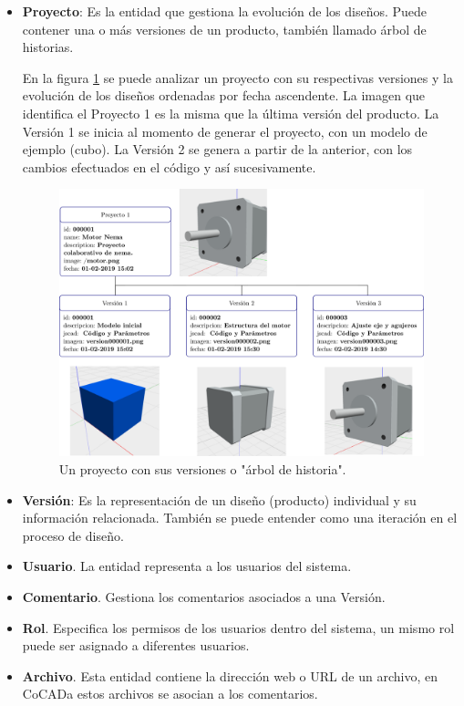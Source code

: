 \begin{itemize}
    \item \textbf{Proyecto}: Es la entidad que gestiona la  evolución de los diseños. Puede contener una o más versiones de un producto, también llamado árbol de historias. 
    
    En la figura \ref{fig:schema2} se puede analizar un  proyecto con su respectivas versiones y la evolución de los diseños ordenadas  por fecha ascendente. La imagen que identifica el Proyecto 1 es la misma que la última versión del producto. La Versión 1 se inicia al momento de generar el proyecto, con un modelo de ejemplo (cubo). La  Versión 2 se genera a partir de la anterior, con los cambios efectuados en el código y así sucesivamente.
    
    \begin{figure}[h]
    \includegraphics[width=16cm]{Img/Desarrollo/cocada-de.png}
    \centering
    \caption{\footnotesize{Un proyecto con sus versiones o "árbol de historia". }}
    \label{fig:schema2}
    \end{figure}
    
    \item \textbf{Versión}: Es la representación de un diseño (producto) individual y su información relacionada. También se puede entender como una iteración en el proceso de diseño. 
    
    
    \item \textbf{Usuario}. La entidad representa a los usuarios del sistema. 
    
    \item \textbf{Comentario}. 
    Gestiona los comentarios asociados a una Versión.
    
    \item \textbf{Rol}. Especifica los permisos de los usuarios dentro del sistema, un mismo rol puede ser asignado a diferentes usuarios.
    
    \item \textbf{Archivo}. Esta entidad contiene la dirección web o URL de un archivo, en CoCADa estos archivos se asocian a los comentarios.
    
\end{itemize}

